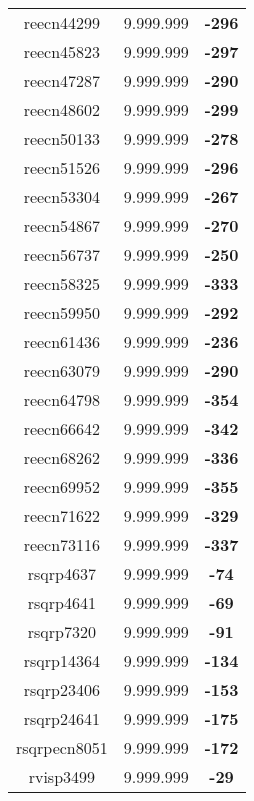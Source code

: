 \begin{tabular}{cc||c}
reecn44299       & 9.999.999        & {\bf -296}      \\ 
reecn45823       & 9.999.999        & {\bf -297}      \\ 
reecn47287       & 9.999.999        & {\bf -290}      \\ 
reecn48602       & 9.999.999        & {\bf -299}      \\ 
reecn50133       & 9.999.999        & {\bf -278}      \\ 
reecn51526       & 9.999.999        & {\bf -296}      \\ 
reecn53304       & 9.999.999        & {\bf -267}      \\ 
reecn54867       & 9.999.999        & {\bf -270}      \\ 
reecn56737       & 9.999.999        & {\bf -250}      \\ 
reecn58325       & 9.999.999        & {\bf -333}      \\ 
reecn59950       & 9.999.999        & {\bf -292}      \\ 
reecn61436       & 9.999.999        & {\bf -236}      \\ 
reecn63079       & 9.999.999        & {\bf -290}      \\ 
reecn64798       & 9.999.999        & {\bf -354}      \\ 
reecn66642       & 9.999.999        & {\bf -342}      \\ 
reecn68262       & 9.999.999        & {\bf -336}      \\ 
reecn69952       & 9.999.999        & {\bf -355}      \\ 
reecn71622       & 9.999.999        & {\bf -329}      \\ 
reecn73116       & 9.999.999        & {\bf -337}      \\ 
rsqrp4637        & 9.999.999        & {\bf -74}       \\ 
rsqrp4641        & 9.999.999        & {\bf -69}       \\ 
rsqrp7320        & 9.999.999        & {\bf -91}       \\ 
rsqrp14364       & 9.999.999        & {\bf -134}      \\ 
rsqrp23406       & 9.999.999        & {\bf -153}      \\ 
rsqrp24641       & 9.999.999        & {\bf -175}      \\ 
rsqrpecn8051     & 9.999.999        & {\bf -172}      \\ 
rvisp3499        & 9.999.999        & {\bf -29}       \\ 

\end{tabular}
